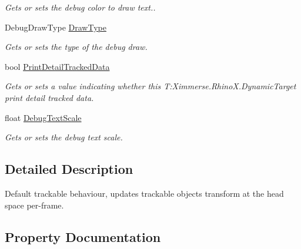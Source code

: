 \begin{DoxyCompactItemize}
\begin{DoxyCompactList}\small\item\em Gets or sets the debug color to draw text.. \end{DoxyCompactList}\item 
Debug\+Draw\+Type \mbox{\hyperlink{class_ximmerse_1_1_rhino_x_1_1_dynamic_target_a3d14c67bb9a13513f9227ccc7cf8d38d}{Draw\+Type}}
\begin{DoxyCompactList}\small\item\em Gets or sets the type of the debug draw. \end{DoxyCompactList}\item 
bool \mbox{\hyperlink{class_ximmerse_1_1_rhino_x_1_1_dynamic_target_a5ef7419287f85eb97806cea82d617d01}{Print\+Detail\+Tracked\+Data}}
\begin{DoxyCompactList}\small\item\em Gets or sets a value indicating whether this T\+:\+Ximmerse.\+Rhino\+X.\+Dynamic\+Target print detail tracked data. \end{DoxyCompactList}\item 
float \mbox{\hyperlink{class_ximmerse_1_1_rhino_x_1_1_dynamic_target_a6b87feb1464720270d2fdfd18966c933}{Debug\+Text\+Scale}}
\begin{DoxyCompactList}\small\item\em Gets or sets the debug text scale. \end{DoxyCompactList}\end{DoxyCompactItemize}


\subsection{Detailed Description}
Default trackable behaviour, updates trackable object\textquotesingle{}s transform at the head space per-\/frame. 



\subsection{Property Documentation}
\mbox{\label{class_ximmerse_1_1_rhino_x_1_1_dynamic_target_af798d3c901e13bc79c03c1044c95849b}} 
